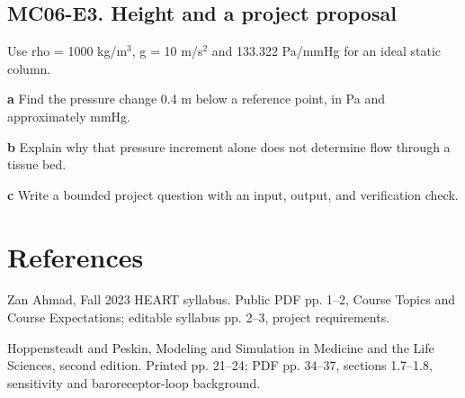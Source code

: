 \documentclass[11pt,letterpaper]{article}
\theoremstyle{definition}\newtheorem{definition}{Definition}\newtheorem{example}{Example}
\numberwithin{equation}{section}
\begin{document}
\par\noindent\begin{minipage}{\linewidth}
\subsection*{MC06-E3. Height and a project proposal}
Use rho =\allowbreak{} 1000 kg/m$^3$, g =\allowbreak{} 10 m/s$^2$ and 133.322 Pa/mmHg for an ideal static column.

\textbf{a} Find the pressure change 0.4 m below a reference point, in Pa and approximately mmHg.

\end{minipage}\par\medskip
\textbf{b} Explain why that pressure increment alone does not determine flow through a tissue bed.

\textbf{c} Write a bounded project question with an input, output, and verification check.

\section*{References}
\noindent\begin{minipage}{\linewidth}
Zan Ahmad, Fall 2023 HEART syllabus. Public PDF pp. 1--2, Course Topics and Course Expectations; editable syllabus pp. 2--3, project requirements.

\end{minipage}\par\medskip
\noindent\begin{minipage}{\linewidth}
Hoppensteadt and Peskin, Modeling and Simulation in Medicine and the Life Sciences, second edition. Printed pp. 21--24; PDF pp. 34--37, sections 1.7--1.8, sensitivity and baroreceptor-loop background.

\end{minipage}\par\medskip
\end{document}
